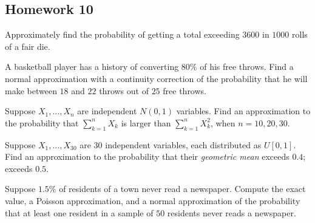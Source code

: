 \subsection{Homework 10}
\begin{problem}[Handout 14, \# 5]
  Approximately find the probability of getting a total exceeding \(3600\)
  in \(1000\) rolls of a fair die.
\end{problem}
\begin{solution}

\end{solution}

\begin{problem}[Handout 14, \# 6]
  A basketball player has a history of converting \(80\%\) of his free
  throws. Find a normal approximation with a continuity correction of the
  probability that he will make between \(18\) and \(22\) throws out of
  \(25\) free throws.
\end{problem}
\begin{solution}

\end{solution}

\begin{problem}[Handout 14, \# 7]
  Suppose \(X_1,\dotsc,X_n\) are independent \(N(0,1)\)
  variables. Find an approximation to the probability that
  \(\sum_{k=1}^n X_k\) is larger than \(\sum_{k=1}^n X_k^2\), when
  \(n=10,20,30\).
\end{problem}
\begin{solution}

\end{solution}

\begin{problem}
  Suppose \(X_1,\dotsc,X_{30}\) are \(30\) independent variables, each
  distributed as \(U[0,1]\). Find an approximation to the probability that
  their \emph{geometric mean} exceeds \(0.4\); exceeds \(0.5\).
\end{problem}
\begin{solution}

\end{solution}

\begin{problem}
  Suppose \(1.5\%\) of residents of a town never read a newspaper. Compute
  the exact value, a Poisson approximation, and a normal approximation of
  the probability that at least one resident in a sample of \(50\)
  residents never reads a newspaper.
\end{problem}
\begin{solution}

\end{solution}

